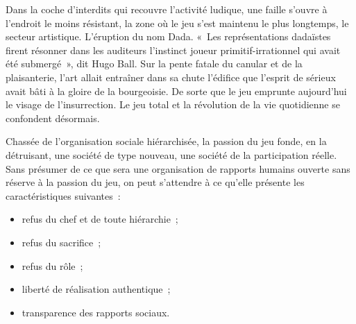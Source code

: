 \documentclass[french,twoside]{book} %
\newcommand{\astermono}{\medskip\centerline{\color{rubric}\large\selectfont{\syms ✻}}\medskip\par}%
\begin{document}
Dans la coche d’interdits qui recouvre l’activité ludique, une faille s’ouvre à l’endroit le moins résistant, la zone où le jeu s’est maintenu le plus longtemps, le secteur artistique. L’éruption du nom Dada. « Les représentations dadaïstes firent résonner dans les auditeurs l’instinct joueur primitif-irrationnel qui avait été submergé », dit Hugo Ball. Sur la pente fatale du canular et de la plaisanterie, l’art allait entraîner dans sa chute l’édifice que l’esprit de sérieux avait bâti à la gloire de la bourgeoisie. De sorte que le jeu emprunte aujourd’hui le visage de l’insurrection. Le jeu total et la révolution de la vie quotidienne se confondent désormais.\par
Chassée de l’organisation sociale hiérarchisée, la passion du jeu fonde, en la détruisant, une société de type nouveau, une société de la participation réelle. Sans présumer de ce que sera une organisation de rapports humains ouverte sans réserve à la passion du jeu, on peut s’attendre à ce qu’elle présente les caractéristiques suivantes :\par

\begin{itemize}[itemsep=0pt,]
\item refus du chef et de toute hiérarchie ;
\item refus du sacrifice ;
\item refus du rôle ;
\item liberté de réalisation authentique ;
\item transparence des rapports sociaux.
\end{itemize}


\astermono
\end{document}
